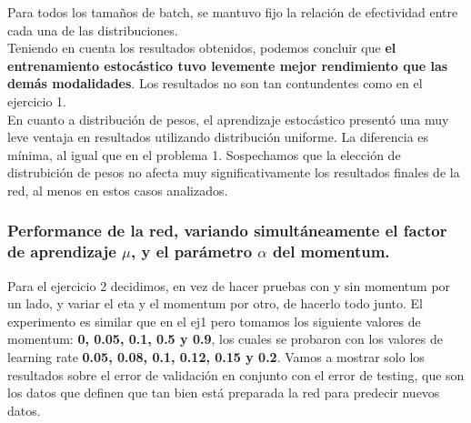 Para todos los tamaños de batch, se mantuvo fijo la relación de efectividad entre cada una de las distribuciones.\\

Teniendo en cuenta los resultados obtenidos, podemos concluir que \textbf{el entrenamiento estocástico tuvo levemente mejor rendimiento que las demás modalidades}. Los resultados no son tan contundentes como en el ejercicio 1.\\

En cuanto a distribución de pesos, el aprendizaje estocástico presentó una muy leve ventaja en resultados utilizando distribución uniforme. La diferencia es mínima, al igual que en el problema 1. Sospechamos que la elección de distrubición de pesos no afecta muy significativamente los resultados finales de la red, al menos en estos casos analizados.\\

\subsubsection{Performance de la red, variando simultáneamente el factor de aprendizaje $\mu$, y el parámetro $\alpha$ del momentum.}

Para el ejercicio 2 decidimos, en vez de hacer pruebas con y sin momentum por un lado, y variar el eta y el momentum por otro, de hacerlo todo junto.
El experimento es similar que en el ej1 pero tomamos los siguiente valores de momentum: \textbf{0, 0.05, 0.1, 0.5 y 0.9}, los cuales se 
probaron con los valores de learning rate \textbf{0.05, 0.08, 0.1, 0.12, 0.15 y 0.2}. Vamos a mostrar solo los resultados sobre el error de validación 
en conjunto con el error de testing, que son los datos que definen que tan bien está preparada la red para predecir nuevos datos.

